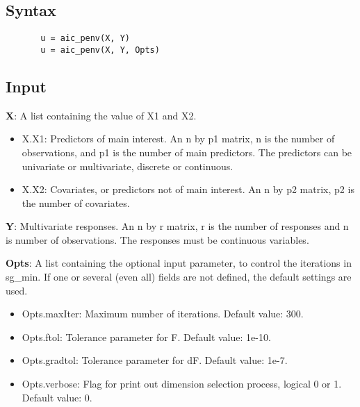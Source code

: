 \documentclass[a4paper,11pt,openany]{memoir}
\begin{document}
\subsection*{Syntax}


\begin{verbatim}       u = aic_penv(X, Y)
       u = aic_penv(X, Y, Opts)\end{verbatim}
    

\subsection*{Input}

\begin{par}
\textbf{X}: A list containing the value of X1 and X2.
\end{par} \vspace{1em}
\begin{itemize}
\setlength{\itemsep}{-1ex}
   \item X.X1: Predictors of main interest. An n by p1 matrix, n is the number of observations, and p1 is the number of main predictors. The predictors can be univariate or multivariate, discrete or continuous.
   \item X.X2: Covariates, or predictors not of main interest.  An n by p2 matrix, p2 is the number of covariates.
\end{itemize}
\begin{par}
\textbf{Y}: Multivariate responses. An n by r matrix, r is the number of responses and n is number of observations. The responses must be continuous variables.
\end{par} \vspace{1em}
\begin{par}
\textbf{Opts}: A list containing the optional input parameter, to control the iterations in sg\_min. If one or several (even all) fields are not defined, the default settings are used.
\end{par} \vspace{1em}
\begin{itemize}
\setlength{\itemsep}{-1ex}
   \item Opts.maxIter: Maximum number of iterations.  Default value: 300.
   \item Opts.ftol: Tolerance parameter for F.  Default value: 1e-10.
   \item Opts.gradtol: Tolerance parameter for dF.  Default value: 1e-7.
   \item Opts.verbose: Flag for print out dimension selection process, logical 0 or 1. Default value: 0.
\end{itemize}
\end{document}
